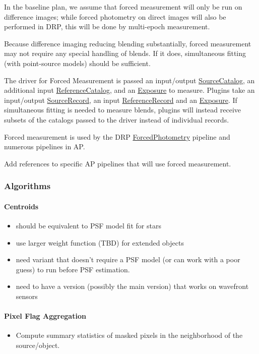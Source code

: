 In the baseline plan, we assume that forced measurement will only be run on difference images; while forced photometry on direct images will also be performed in DRP, this will be done by multi-epoch measurement.

Because difference imaging reducing blending substantially, forced measurement may not require any special handling of blends.  If it does, simultaneous fitting (with point-source models) should be sufficient.

The driver for Forced Measurement is passed an input/output \hyperref[sec:spTablesSource]{SourceCatalog}, an additional input \hyperref[sec:spTablesReference]{ReferenceCatalog}, and an \hyperref[sec:spImagesExposure]{Exposure} to measure.  Plugins take an input/output \hyperref[sec:spTablesSource]{SourceRecord}, an input \hyperref[sec:spTablesReference]{ReferenceRecord} and an \hyperref[sec:spImagesExposure]{Exposure}.  If simultaneous fitting is needed to measure blends, plugins will instead receive subsets of the catalogs passed to the driver instead of individual records.

Forced measurement is used by the DRP \hyperref[sec:drpForcedPhotometry]{ForcedPhotometry} pipeline and numerous pipelines in AP.

\begin{note}[TODO]
Add references to specific AP pipelines that will use forced measurement.
\end{note}

\subsubsection{Algorithms}

\paragraph{Centroids}
\label{sec:acCentroidAlgorithms}
\begin{itemize}
\item should be equivalent to PSF model fit for stars
\item use larger weight function (TBD) for extended objects
\item need variant that doesn't require a PSF model (or can work with a poor guess) to run before PSF estimation.
\item need to have a version (possibly the main version) that works on wavefront sensors
\end{itemize}

\paragraph{Pixel Flag Aggregation}
\label{sec:acPixelFlags}
\begin{itemize}
\item Compute summary statistics of masked pixels in the neighborhood of the source/object.
\end{itemize}

